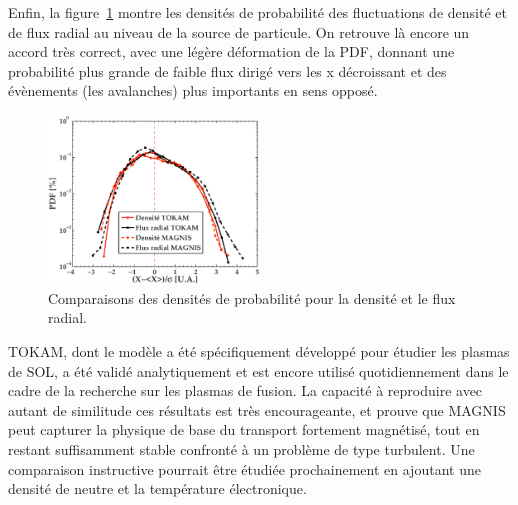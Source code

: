 \begin{refsection}
Enfin, la figure~\ref{4-TokamPDFDensite} montre les densités de probabilité des
fluctuations de densité et de flux radial au niveau de la source de particule.
On retrouve là encore un accord très correct, avec une légère déformation de la
PDF, donnant une probabilité plus grande de faible flux dirigé vers les x
décroissant et des évènements (les avalanches) plus importants en sens opposé.

 \begin{figure}[!htbp]
\centering
\includegraphics[width=0.5\textwidth]{figures/4-TokamPDFDensite.eps}
{\caption{Comparaisons des densités de probabilité pour la densité et
le flux radial.}
\label{4-TokamPDFDensite}}
\end{figure}

TOKAM, dont le modèle a été spécifiquement développé pour étudier les plasmas de
SOL, a été validé analytiquement et est encore utilisé quotidiennement dans le
cadre de la recherche sur les plasmas de fusion. La capacité à
reproduire avec autant de similitude ces résultats est très encourageante,
et prouve que MAGNIS peut capturer la physique de base du
transport fortement magnétisé, tout en restant suffisamment stable confronté à un
problème de type turbulent.
Une comparaison instructive pourrait être étudiée prochainement en ajoutant une
densité de neutre et la température électronique.

\end{refsection}
